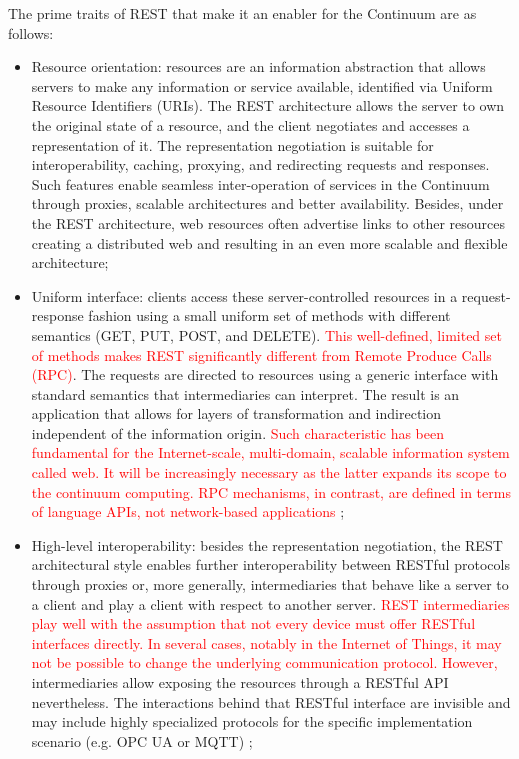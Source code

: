 The prime traits of REST that make it an enabler for the Continuum are as follows:

\begin{itemize}
    \item Resource orientation: resources are an information abstraction that allows servers to make any information or service available, identified via Uniform Resource Identifiers (URIs). The REST architecture allows the server to own the original state of a resource, and the client negotiates and accesses a representation of it. The representation negotiation is suitable for interoperability, caching, proxying, and redirecting requests and responses. Such features enable seamless inter-operation of services in the Continuum through proxies, scalable architectures and better availability. Besides, under the REST architecture, web resources often advertise links to other resources creating a distributed web and resulting in an even more scalable and flexible architecture;
    \item Uniform interface: clients access these server-controlled resources in a request-response fashion using a small uniform set of methods with different semantics (GET, PUT, POST, and DELETE). \textcolor{red}{This well-defined, limited set of methods makes REST significantly different from Remote Produce Calls (RPC)}. The requests are directed to resources using a generic interface with standard semantics that intermediaries can interpret. The result is an application that allows for layers of transformation and indirection independent of the information origin. \textcolor{red}{Such characteristic has been fundamental for the Internet-scale, multi-domain, scalable information system called web. It will be increasingly necessary as the latter expands its scope to the continuum computing. RPC mechanisms, in contrast, are defined in terms of language APIs, not network-based applications \cite{rest}};
    \item High-level interoperability: besides the representation negotiation, the REST architectural style enables further interoperability between RESTful protocols through proxies or, more generally, intermediaries that behave like a server to a client and play a client with respect to another server. \textcolor{red}{REST intermediaries play well with the assumption that not every device must offer RESTful interfaces directly. In several cases, notably in the Internet of Things, it may not be possible to change the underlying communication protocol. However,} intermediaries allow exposing the resources through a RESTful API nevertheless. The interactions behind that RESTful interface are invisible and may include highly specialized protocols for the specific implementation scenario (e.g. OPC UA or MQTT) \cite{guinard2010resource};

\end{itemize}
